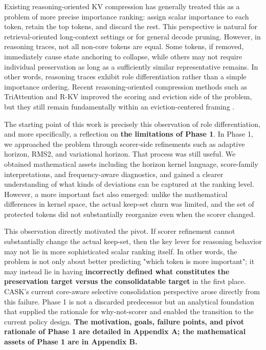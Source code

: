Existing reasoning-oriented KV compression has generally treated this as a problem of more precise importance ranking: assign scalar importance to each token, retain the top tokens, and discard the rest. This perspective is natural for retrieval-oriented long-context settings or for general decode pruning. However, in reasoning traces, not all non-core tokens are equal. Some tokens, if removed, immediately cause state anchoring to collapse, while others may not require individual preservation as long as a sufficiently similar representative remains. In other words, reasoning traces exhibit role differentiation rather than a simple importance ordering. Recent reasoning-oriented compression methods such as TriAttention and R-KV improved the scoring and eviction side of the problem, but they still remain fundamentally within an eviction-centered framing \citep{mao2026triattention,cai2025rkv}.


The starting point of this work is precisely this observation of role differentiation, and more specifically, a reflection on \textbf{the limitations of Phase 1}. In Phase 1, we approached the problem through scorer-side refinements such as adaptive horizon, RMS2, and variational horizon. That process was still useful. We obtained mathematical assets including the horizon kernel language, score-family interpretations, and frequency-aware diagnostics, and gained a clearer understanding of what kinds of deviations can be captured at the ranking level. However, a more important fact also emerged: unlike the mathematical differences in kernel space, the actual keep-set churn was limited, and the set of protected tokens did not substantially reorganize even when the scorer changed.


This observation directly motivated the pivot. If scorer refinement cannot substantially change the actual keep-set, then the key lever for reasoning behavior may not lie in more sophisticated scalar ranking itself. In other words, the problem is not only about better predicting "which token is more important"; it may instead lie in having \textbf{incorrectly defined what constitutes the preservation target versus the consolidatable target} in the first place. CASK's current core-aware selective consolidation perspective arose directly from this failure. Phase 1 is not a discarded predecessor but an analytical foundation that supplied the rationale for why-not-scorer and enabled the transition to the current policy design. \textbf{The motivation, goals, failure points, and pivot rationale of Phase 1 are detailed in Appendix A; the mathematical assets of Phase 1 are in Appendix B.}


